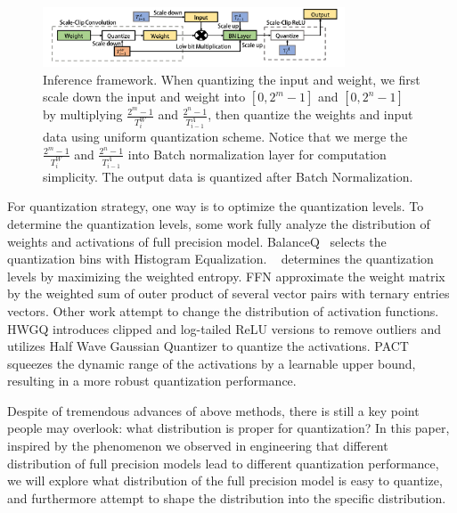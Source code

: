 \documentclass[letterpaper]{article} %
\begin{document}
\begin{figure}[ht!]
	\centering
	\includegraphics[width=0.8\textwidth]{inference_framework.png}
	\caption{Inference framework. When quantizing the input and weight, we first scale down the input and weight into $[0, 2^m-1]$ and $[0,2^n-1]$ by multiplying $\frac{2^m-1}{T^W_{i}}$ and $\frac{2^n-1}{T^A_{i-1}}$, then quantize the weights and input data using uniform quantization scheme. Notice that we merge the $\frac{2^m-1}{T^W_{i}}$ and $\frac{2^n-1}{T^A_{i-1}}$ into Batch normalization layer for computation simplicity. The output data is quantized after Batch Normalization.}\label{inference framework}
\end{figure}
For quantization strategy, one way is to optimize the quantization levels. To determine the quantization levels, some work fully analyze the distribution of weights and activations of full precision model. 
BalanceQ~\cite{zhou2017balanced} selects the quantization bins with Histogram Equalization.
~\cite{park2017weighted} determines the quantization levels by maximizing the weighted entropy.
FFN\cite{wang2017fixed} approximate the weight matrix by the weighted sum of outer product of several vector pairs with ternary entries vectors. 
Other work attempt to change the distribution of activation functions. 
HWGQ\cite{cai2017deep} introduces clipped and log-tailed ReLU versions to remove outliers and utilizes Half Wave Gaussian Quantizer to quantize the activations. PACT\cite{choi2018pact} squeezes the dynamic range of the activations by a learnable upper bound, resulting in a more robust quantization performance.

Despite of tremendous advances of above methods, 
there is still a key point people may overlook: what distribution is proper for quantization? In this paper, inspired by the phenomenon we observed in engineering that different distribution of full precision models lead to different quantization performance, we will explore what distribution of the full precision model is easy to quantize, and furthermore attempt to shape the distribution into the specific distribution.
\end{document}
